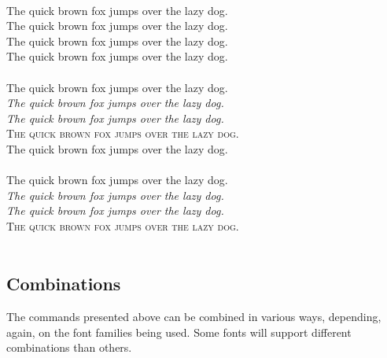 \documentclass[a4paper,oneside,11pt]{article}
\begin{document}
\begin{titled-frame}
\begin{verbatim}
\end{verbatim}
\normalsize
{}\\
{\selectfont The quick brown fox jumps over the lazy dog.}\\
{\selectfont The quick brown fox jumps over the lazy dog.}\\
{\otherscshape\selectfont The quick brown fox jumps over the lazy dog.}\\
{\otherscslshape\selectfont The quick brown fox jumps over the lazy dog.}\\\\
{\upshape The quick brown fox jumps over the lazy dog.}\\
{\itshape The quick brown fox jumps over the lazy dog.}\\
{\slshape The quick brown fox jumps over the lazy dog.}\\
{\scshape The quick brown fox jumps over the lazy dog.}\\
{\scslshape The quick brown fox jumps over the lazy dog.}\\\\
\textup{The quick brown fox jumps over the lazy dog.}\\
\textit{The quick brown fox jumps over the lazy dog.}\\
\textsl{The quick brown fox jumps over the lazy dog.}\\
\textsc{The quick brown fox jumps over the lazy dog.}\\
\\
\vspace{-1em}
\end{titled-frame}


\subsection{Combinations}
\label{subsec:combinations}

The  commands presented  above can  be  combined in  various ways,  depending,
again,  on the  font families  being used. Some  fonts will  support different
combinations than others.
\end{document}
